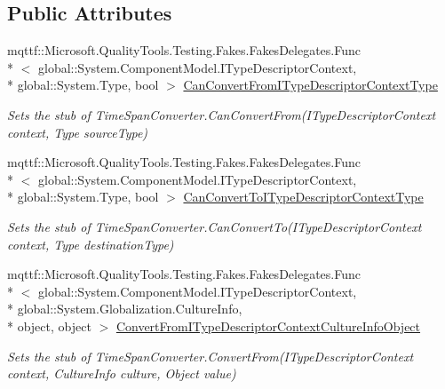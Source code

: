 \subsection*{Public Attributes}
\begin{DoxyCompactItemize}
\item 
mqttf\-::\-Microsoft.\-Quality\-Tools.\-Testing.\-Fakes.\-Fakes\-Delegates.\-Func\\*
$<$ global\-::\-System.\-Component\-Model.\-I\-Type\-Descriptor\-Context, \\*
global\-::\-System.\-Type, bool $>$ \hyperlink{class_system_1_1_component_model_1_1_fakes_1_1_stub_time_span_converter_a9bdfaa1dbb25ef6df23a1123aab1036f}{Can\-Convert\-From\-I\-Type\-Descriptor\-Context\-Type}
\begin{DoxyCompactList}\small\item\em Sets the stub of Time\-Span\-Converter.\-Can\-Convert\-From(\-I\-Type\-Descriptor\-Context context, Type source\-Type)\end{DoxyCompactList}\item 
mqttf\-::\-Microsoft.\-Quality\-Tools.\-Testing.\-Fakes.\-Fakes\-Delegates.\-Func\\*
$<$ global\-::\-System.\-Component\-Model.\-I\-Type\-Descriptor\-Context, \\*
global\-::\-System.\-Type, bool $>$ \hyperlink{class_system_1_1_component_model_1_1_fakes_1_1_stub_time_span_converter_a77249b036dd3ddbfcef7256a381d89d5}{Can\-Convert\-To\-I\-Type\-Descriptor\-Context\-Type}
\begin{DoxyCompactList}\small\item\em Sets the stub of Time\-Span\-Converter.\-Can\-Convert\-To(\-I\-Type\-Descriptor\-Context context, Type destination\-Type)\end{DoxyCompactList}\item 
mqttf\-::\-Microsoft.\-Quality\-Tools.\-Testing.\-Fakes.\-Fakes\-Delegates.\-Func\\*
$<$ global\-::\-System.\-Component\-Model.\-I\-Type\-Descriptor\-Context, \\*
global\-::\-System.\-Globalization.\-Culture\-Info, \\*
object, object $>$ \hyperlink{class_system_1_1_component_model_1_1_fakes_1_1_stub_time_span_converter_af83a5a266dda94be5eb133fa83d387bd}{Convert\-From\-I\-Type\-Descriptor\-Context\-Culture\-Info\-Object}
\begin{DoxyCompactList}\small\item\em Sets the stub of Time\-Span\-Converter.\-Convert\-From(\-I\-Type\-Descriptor\-Context context, Culture\-Info culture, Object value)\end{DoxyCompactList}\item 

\end{DoxyCompactItemize}
